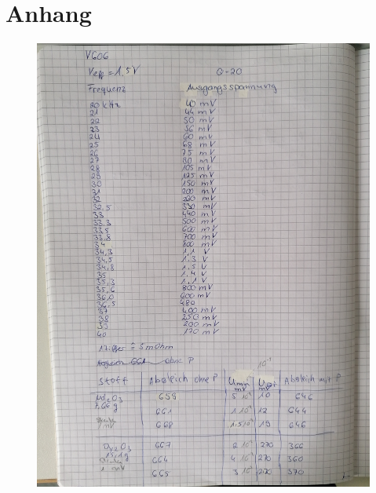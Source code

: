 \section{Anhang}

\begin{figure}
    \centering
    \includegraphics[width=\textwidth]{content/Anhang1.jpg}
\end{figure}

